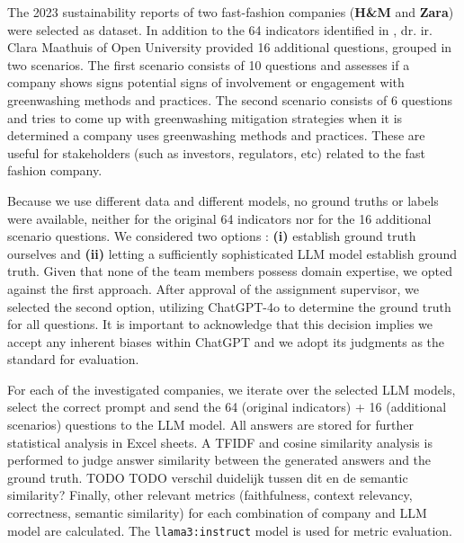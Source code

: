 \documentclass[]{article}
\begin{document}
The 2023 sustainability reports of two fast-fashion companies (\textbf{H\&M} and \textbf{Zara}) were selected as dataset.
In addition to the 64 indicators identified in \cite{durability}, dr. ir. Clara Maathuis of Open University \cite{ou} provided 16 additional questions, grouped in two scenarios.
The first scenario consists of 10 questions and assesses if a company shows signs potential signs of involvement or engagement with greenwashing methods and practices.
The second scenario consists of 6 questions and tries to come up with greenwashing mitigation strategies when it is determined a company uses greenwashing methods and practices.
These are useful for stakeholders (such as investors, regulators, etc) related to the fast fashion company.

Because we use different data and different models, no ground truths or labels were available, neither for the original 64 indicators nor for the 16 additional scenario questions.
We considered two options : \textbf{(i)} establish ground truth ourselves and \textbf{(ii)} letting a sufficiently sophisticated LLM model establish ground truth.
Given that none of the team members possess domain expertise, we opted against the first approach.
After approval of the assignment supervisor, we selected the second option, utilizing ChatGPT-4o to determine the ground truth for all questions.
It is important to acknowledge that this decision implies we accept any inherent biases within ChatGPT and we adopt its judgments as the standard for evaluation.

For each of the investigated companies, we iterate over the selected LLM models, select the correct prompt and send the 64 (original indicators) + 16 (additional scenarios) questions to the LLM model.
All answers are stored for further statistical analysis in Excel sheets.
A TFIDF and cosine similarity analysis is performed to judge answer similarity between the generated answers and the ground truth.  TODO TODO verschil duidelijk tussen dit en de semantic similarity?
Finally, other relevant metrics (faithfulness, context relevancy, correctness, semantic similarity) for each combination of company and LLM model are calculated.
The \texttt{llama3:instruct} model is used for metric evaluation.
\end{document}
